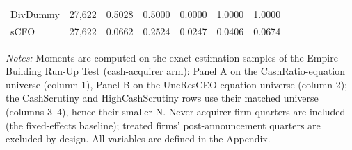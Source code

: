 \begin{table}[htbp]
\begin{tabular}{lrrrrrr}
DivDummy & 27,622 & 0.5028 & 0.5000 & 0.0000 & 1.0000 & 1.0000 \\
sCFO & 27,622 & 0.0662 & 0.2524 & 0.0247 & 0.0406 & 0.0674 \\
\bottomrule
\end{tabular}
\begin{minipage}{\linewidth}
\vspace{2pt}\scriptsize
\textit{Notes:} Moments are computed on the exact estimation samples of the Empire-Building Run-Up Test (cash-acquirer arm): Panel A on the CashRatio-equation universe (column 1), Panel B on the UncResCEO-equation universe (column 2); the CashScrutiny and HighCashScrutiny rows use their matched universe (columns 3--4), hence their smaller N. Never-acquirer firm-quarters are included (the fixed-effects baseline); treated firms' post-announcement quarters are excluded by design. All variables are defined in the Appendix.
\end{minipage}
\end{table}